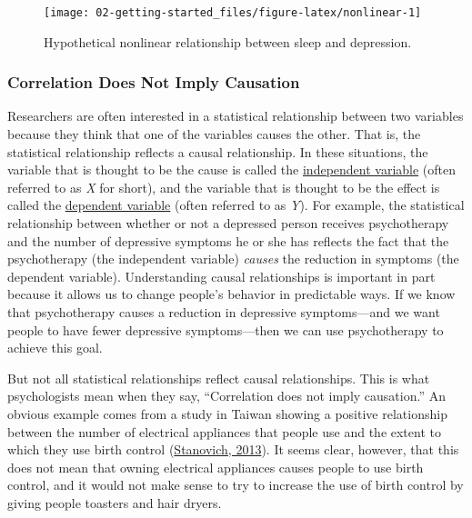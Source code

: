 \documentclass[
]{krantz}
\begin{document}
\begin{figure}

{\centering \texttt{[image: 02-getting-started\_files/figure-latex/nonlinear-1]} 

}

\caption{Hypothetical nonlinear relationship between sleep and depression.}\label{fig:nonlinear}
\end{figure}

\hypertarget{correlation-does-not-imply-causation}{%
\subsubsection*{Correlation Does Not Imply Causation}\label{correlation-does-not-imply-causation}}


Researchers are often interested in a statistical relationship between two variables because they think that one of the variables causes the other. That is, the statistical relationship reflects a causal relationship. In these situations, the variable that is thought to be the cause is called the \protect\hyperlink{independent-variable}{independent variable} (often referred to as \emph{X} for short), and the variable that is thought to be the effect is called the \protect\hyperlink{dependent-variable}{dependent variable} (often referred to as \emph{Y}). For example, the statistical relationship between whether or not a depressed person receives psychotherapy and the number of depressive symptoms he or she has reflects the fact that the psychotherapy (the independent variable) \emph{causes} the reduction in symptoms (the dependent variable). Understanding causal relationships is important in part because it allows us to change people's behavior in predictable ways. If we know that psychotherapy causes a reduction in depressive symptoms---and we want people to have fewer depressive symptoms---then we can use psychotherapy to achieve this goal.

But not all statistical relationships reflect causal relationships. This is what psychologists mean when they say, ``Correlation does not imply causation.'' An obvious example comes from a study in Taiwan showing a positive relationship between the number of electrical appliances that people use and the extent to which they use birth control (\protect\hyperlink{ref-stanovich2013think}{Stanovich, 2013}). It seems clear, however, that this does not mean that owning electrical appliances causes people to use birth control, and it would not make sense to try to increase the use of birth control by giving people toasters and hair dryers.
\end{document}
